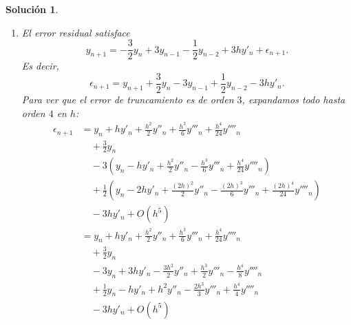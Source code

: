 \documentclass[11pt]{article}
\newtheorem*{sol}{Solución}
\begin{document}
\begin{sol}
  \begin{enumerate}
    \item
      El error residual satisface
      \begin{equation}
        y_{n+1}
        = -\frac{3}{2}y_n + 3y_{n-1} - \frac{1}{2}y_{n-2} + 3hy'_n
        + \epsilon_{n+1}
      .\end{equation}
      Es decir,
      \begin{equation}
        \epsilon_{n+1}
        =
        y_{n+1}
        +\frac{3}{2}y_n - 3y_{n-1} + \frac{1}{2}y_{n-2} - 3hy'_n
      .\end{equation}
      Para ver que el error de truncamiento es de orden $3$,
      expandamos todo hasta orden $4$ en $h$:
      \begin{align}
        \epsilon_{n+1}
        &=
          y_{n}
          + hy'_n
          + \frac{h^{2}}{2} y''_n
          + \frac{h^{3}}{6} y'''_n
          + \frac{h^{4}}{24} y''''_n
        \\
        & \quad
        + \frac{3}{2}y_n
        \\
        &\quad
        - 3\left(
          y_n
          - h y'_n
          + \frac{h^{2}}{2} y''_n
          - \frac{h^{3}}{6} y'''_n
          + \frac{h^{4}}{24} y''''_n
          \right)
          \\
        &\quad
        + \frac{1}{2}\left(
          y_n
          - 2h y'_n
          + \frac{(2h)^{2}}{2} y''_n
          - \frac{(2h)^{3}}{6} y'''_n
          + \frac{(2h)^{4}}{24} y''''_n
          \right)
          \\
        &\quad
          - 3hy'_n
          + O(h^{5})
        \\
        &=
          y_{n}
          + hy'_n
          + \frac{h^{2}}{2} y''_n
          + \frac{h^{3}}{6} y'''_n
          + \frac{h^{4}}{24} y''''_n
        \\
        & \quad
        + \frac{3}{2}y_n
        \\
        &\quad
          - 3 y_n
          + 3 h y'_n
          - \frac{3h^{2}}{2} y''_n
          + \frac{h^{3}}{2} y'''_n
          - \frac{h^{4}}{8} y''''_n
          \\
        &\quad
          + \frac{1}{2} y_n
          - h y'_n
          + h^{2} y''_n
          - \frac{2h^{3}}{3} y'''_n
          + \frac{h^{4}}{4} y''''_n
          \\
        &\quad
          - 3hy'_n
          + O(h^{5})
        \\

\end{align}
\end{enumerate}
\end{sol}
\end{document}
